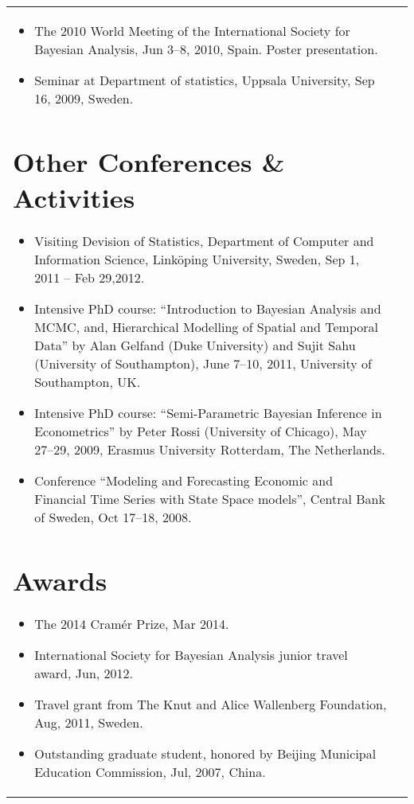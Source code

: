 \documentclass[twoside,a4paper,10.5pt]{article}
\begin{document}
\begin{tabular}{ll}
\begin{itemize}
\item The 2010 World Meeting of the International Society for Bayesian Analysis, Jun 3--8, 2010, Spain. Poster presentation.

\item Seminar at Department of statistics, Uppsala University, Sep 16, 2009, Sweden.

\end{itemize}


\section*{Other Conferences \& Activities}
\begin{itemize}
\item Visiting Devision of Statistics, Department of Computer and Information Science, Linköping University, Sweden, Sep 1, 2011 -- Feb 29,2012.

\item Intensive PhD course: ``Introduction to Bayesian Analysis and MCMC, and, Hierarchical Modelling of Spatial and Temporal Data'' by Alan Gelfand (Duke University) and Sujit Sahu (University of Southampton), June 7--10, 2011, University of Southampton, UK.

\item Intensive PhD course: ``Semi-Parametric Bayesian Inference in Econometrics'' by Peter Rossi (University of Chicago), May 27--29, 2009, Erasmus University Rotterdam, The Netherlands.

\item Conference ``Modeling and Forecasting Economic and Financial Time Series with State Space models'', Central Bank of Sweden, Oct 17--18, 2008.
\end{itemize}

\section*{Awards}
\begin{itemize}

\item The 2014 Cramér Prize, Mar 2014.

\item International Society for Bayesian Analysis junior travel award, Jun, 2012.

\item Travel grant from The Knut and Alice Wallenberg Foundation, Aug, 2011, Sweden.

\item Outstanding graduate student, honored by Beijing Municipal Education Commission, Jul, 2007, China.


\end{itemize}
\end{tabular}
\end{document}
